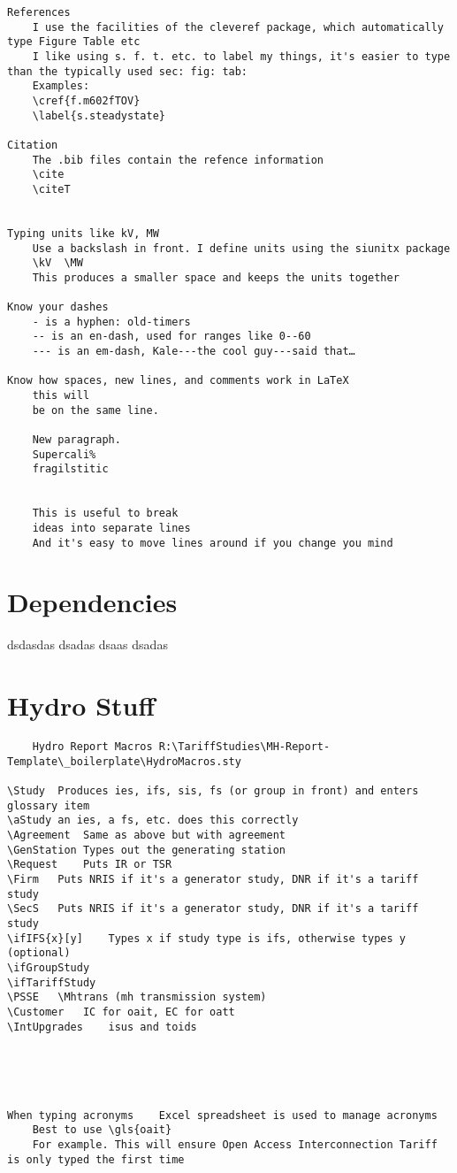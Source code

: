 \documentclass{corpboreport}
\begin{document}
\begin{lstlisting}
References
	I use the facilities of the cleveref package, which automatically type Figure Table etc
	I like using s. f. t. etc. to label my things, it's easier to type than the typically used sec: fig: tab:
	Examples:
	\cref{f.m602fTOV}
	\label{s.steadystate}

Citation
	The .bib files contain the refence information
	\cite
	\citeT


Typing units like kV, MW
	Use a backslash in front. I define units using the siunitx package
	\kV  \MW
	This produces a smaller space and keeps the units together

Know your dashes
	- is a hyphen: old-timers
	-- is an en-dash, used for ranges like 0--60
	--- is an em-dash, Kale---the cool guy---said that…

Know how spaces, new lines, and comments work in LaTeX
	this will
	be on the same line.

	New paragraph.
	Supercali%
	fragilstitic


	This is useful to break
	ideas into separate lines
	And it's easy to move lines around if you change you mind
\end{lstlisting}



\section{Dependencies}
dsdasdas dsadas
dsaas dsadas

\PrintEndOfDocument*

\section{Hydro Stuff}

\begin{lstlisting}
	Hydro Report Macros	R:\TariffStudies\MH-Report-Template\_boilerplate\HydroMacros.sty

\Study	Produces ies, ifs, sis, fs (or group in front) and enters glossary item
\aStudy	an ies, a fs, etc. does this correctly
\Agreement	Same as above but with agreement
\GenStation	Types out the generating station
\Request	Puts IR or TSR
\Firm	Puts NRIS if it's a generator study, DNR if it's a tariff study
\SecS	Puts NRIS if it's a generator study, DNR if it's a tariff study
\ifIFS{x}[y]	Types x if study type is ifs, otherwise types y (optional)
\ifGroupStudy
\ifTariffStudy
\PSSE	\Mhtrans (mh transmission system)
\Customer	IC for oait, EC for oatt
\IntUpgrades	isus and toids





When typing acronyms	Excel spreadsheet is used to manage acronyms
	Best to use \gls{oait}
	For example. This will ensure Open Access Interconnection Tariff is only typed the first time

\end{lstlisting}
\end{document}
